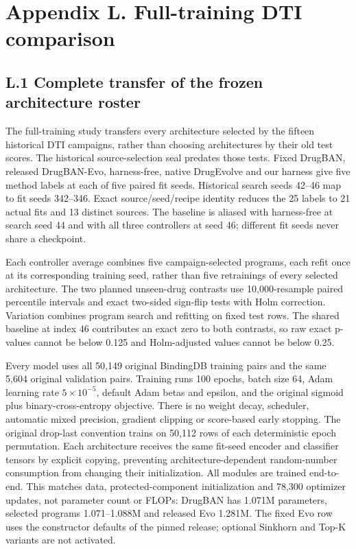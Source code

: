 \section*{Appendix L. Full-training DTI comparison}
\renewcommand{\thetable}{L.\arabic{table}}
\renewcommand{\theHtable}{L.\arabic{table}}
\setcounter{table}{0}
\subsection*{L.1 Complete transfer of the frozen architecture roster}
The full-training study transfers every architecture selected by the fifteen historical DTI campaigns, rather than choosing architectures by their old test scores. The historical source-selection seal predates those tests. Fixed DrugBAN, released DrugBAN-Evo, harness-free, native DrugEvolve and our harness give five method labels at each of five paired fit seeds. Historical search seeds 42--46 map to fit seeds 342--346. Exact source/seed/recipe identity reduces the 25 labels to 21 actual fits and 13 distinct sources. The baseline is aliased with harness-free at search seed 44 and with all three controllers at seed 46; different fit seeds never share a checkpoint.

Each controller average combines five campaign-selected programs, each refit once at its corresponding training seed, rather than five retrainings of every selected architecture. The two planned unseen-drug contrasts use 10,000-resample paired percentile intervals and exact two-sided sign-flip tests with Holm correction. Variation combines program search and refitting on fixed test rows. The shared baseline at index 46 contributes an exact zero to both contrasts, so raw exact p-values cannot be below 0.125 and Holm-adjusted values cannot be below 0.25.

Every model uses all 50,149 original BindingDB training pairs and the same 5,604 original validation pairs. Training runs 100 epochs, batch size 64, Adam learning rate $5\times10^{-5}$, default Adam betas and epsilon, and the original sigmoid plus binary-cross-entropy objective. There is no weight decay, scheduler, automatic mixed precision, gradient clipping or score-based early stopping. The original drop-last convention trains on 50,112 rows of each deterministic epoch permutation. Each architecture receives the same fit-seed encoder and classifier tensors by explicit copying, preventing architecture-dependent random-number consumption from changing their initialization. All modules are trained end-to-end. This matches data, protected-component initialization and 78,300 optimizer updates, not parameter count or FLOPs: DrugBAN has 1.071M parameters, selected programs 1.071--1.088M and released Evo 1.281M. The fixed Evo row uses the constructor defaults of the pinned release; optional Sinkhorn and Top-K variants are not activated.

